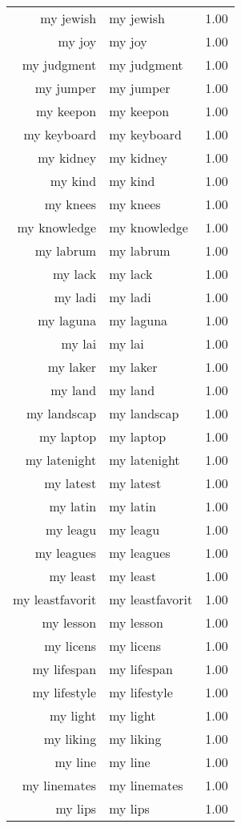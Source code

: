 \begin{table}[ht]
\begin{tabular}{rlr}
  my jewish & my jewish & 1.00 \\ 
  my joy & my joy & 1.00 \\ 
  my judgment & my judgment & 1.00 \\ 
  my jumper & my jumper & 1.00 \\ 
  my keepon & my keepon & 1.00 \\ 
  my keyboard & my keyboard & 1.00 \\ 
  my kidney & my kidney & 1.00 \\ 
  my kind & my kind & 1.00 \\ 
  my knees & my knees & 1.00 \\ 
  my knowledge & my knowledge & 1.00 \\ 
  my labrum & my labrum & 1.00 \\ 
  my lack & my lack & 1.00 \\ 
  my ladi & my ladi & 1.00 \\ 
  my laguna & my laguna & 1.00 \\ 
  my lai & my lai & 1.00 \\ 
  my laker & my laker & 1.00 \\ 
  my land & my land & 1.00 \\ 
  my landscap & my landscap & 1.00 \\ 
  my laptop & my laptop & 1.00 \\ 
  my latenight & my latenight & 1.00 \\ 
  my latest & my latest & 1.00 \\ 
  my latin & my latin & 1.00 \\ 
  my leagu & my leagu & 1.00 \\ 
  my leagues & my leagues & 1.00 \\ 
  my least & my least & 1.00 \\ 
  my leastfavorit & my leastfavorit & 1.00 \\ 
  my lesson & my lesson & 1.00 \\ 
  my licens & my licens & 1.00 \\ 
  my lifespan & my lifespan & 1.00 \\ 
  my lifestyle & my lifestyle & 1.00 \\ 
  my light & my light & 1.00 \\ 
  my liking & my liking & 1.00 \\ 
  my line & my line & 1.00 \\ 
  my linemates & my linemates & 1.00 \\ 
  my lips & my lips & 1.00 \\ 

\end{tabular}
\end{table}
